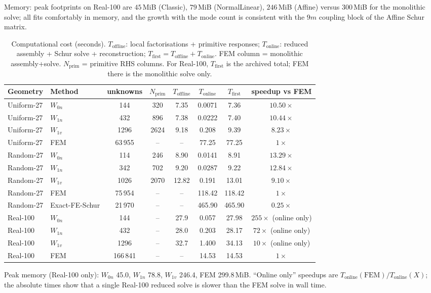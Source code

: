 \documentclass[11pt,a4paper]{article}
\begin{document}
Memory: peak footprints on Real-100 are $45$\,MiB (Classic),
$79$\,MiB (NormalLinear), $246$\,MiB (Affine) versus $300$\,MiB for the
monolithic solve; all fits comfortably in memory, and the growth with
the mode count is consistent with the $9m$ coupling block of the
Affine Schur matrix.

\begin{table}[t]
  \centering
  \small
  \caption{Computational cost (seconds).  $T_{\mathrm{offline}}$: local
    factorisations + primitive responses; $T_{\mathrm{online}}$:
    reduced assembly + Schur solve + reconstruction;
    $T_{\mathrm{first}} = T_{\mathrm{offline}}+T_{\mathrm{online}}$.
    FEM column = monolithic assembly+solve.  $N_{\mathrm{prim}}$ =
    primitive RHS columns.  For Real-100, $T_{\mathrm{first}}$ is the
    archived total; FEM there is the monolithic solve only.}
  \label{tab:cost}
  \begin{tabular}{llcccccc}
    \toprule
    Geometry & Method & unknowns & $N_{\mathrm{prim}}$ &
    $T_{\mathrm{offline}}$ & $T_{\mathrm{online}}$ &
    $T_{\mathrm{first}}$ & speedup vs FEM \\
    \midrule
    Uniform-27 & $W_{0n}$ & 144 & 320 & 7.35 & 0.0071 & 7.36 & $10.50\times$ \\
    Uniform-27 & $W_{1n}$ & 432 & 896 & 7.38 & 0.0222 & 7.40 & $10.44\times$ \\
    Uniform-27 & $W_{1v}$ & 1296 & 2624 & 9.18 & 0.208 & 9.39 & $8.23\times$ \\
    Uniform-27 & FEM & 63\,955 & -- & -- & 77.25 & 77.25 & $1\times$ \\
    \addlinespace[2pt]
    Random-27 & $W_{0n}$ & 114 & 246 & 8.90 & 0.0141 & 8.91 & $13.29\times$ \\
    Random-27 & $W_{1n}$ & 342 & 702 & 9.20 & 0.0287 & 9.22 & $12.84\times$ \\
    Random-27 & $W_{1v}$ & 1026 & 2070 & 12.82 & 0.191 & 13.01 & $9.10\times$ \\
    Random-27 & FEM & 75\,954 & -- & -- & 118.42 & 118.42 & $1\times$ \\
    Random-27 & Exact-FE-Schur & 21\,970 & -- & -- & 465.90 & 465.90 & $0.25\times$ \\
    \addlinespace[2pt]
    Real-100 & $W_{0n}$ & 144 & -- & 27.9 & 0.057 & 27.98 & $255\times$ (online only) \\
    Real-100 & $W_{1n}$ & 432 & -- & 28.0 & 0.203 & 28.17 & $72\times$ (online only) \\
    Real-100 & $W_{1v}$ & 1296 & -- & 32.7 & 1.400 & 34.13 & $10\times$ (online only) \\
    Real-100 & FEM & 166\,841 & -- & -- & 14.53 & 14.53 & $1\times$ \\
    \bottomrule
  \end{tabular}
  \medskip
  \raggedright\footnotesize
  Peak memory (Real-100 only): $W_{0n}$ 45.0, $W_{1n}$ 78.8,
  $W_{1v}$ 246.4, FEM 299.8\,MiB.  ``Online only'' speedups are
  $T_{\mathrm{online}}(\mathrm{FEM})/T_{\mathrm{online}}(X)$; the
  absolute times show that a single Real-100 reduced solve is slower
  than the FEM solve in wall time.
\end{table}
\end{document}
